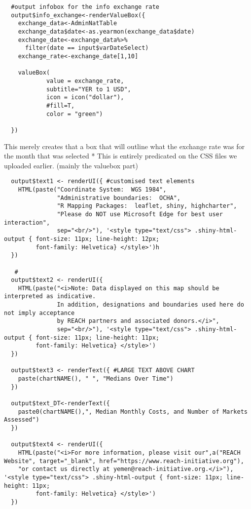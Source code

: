 \documentclass[
]{article}
\begin{document}
\begin{verbatim}
  #output infobox for the info exchange rate
  output$info_exchange<-renderValueBox({
    exchange_data<-AdminNatTable
    exchange_data$date<-as.yearmon(exchange_data$date)
    exchange_date<-exchange_data%>%
      filter(date == input$varDateSelect)
    exchange_rate<-exchange_date[1,10]
    
    valueBox(
            value = exchange_rate,
            subtitle="YER to 1 USD", 
            icon = icon("dollar"),
            #fill=T, 
            color = "green")
   
  })
\end{verbatim}

This merely creates that a box that will outline what the exchange rate
was for the month that was selected * This is entirely predicated on the
CSS files we uploaded earlier. (mainly the valuebox part)

\begin{verbatim}
  output$text1 <- renderUI({ #customised text elements
    HTML(paste("Coordinate System:  WGS 1984",
               "Administrative boundaries:  OCHA",
               "R Mapping Packages:  leaflet, shiny, highcharter",
               "Please do NOT use Microsoft Edge for best user interaction",
               sep="<br/>"), '<style type="text/css"> .shiny-html-output { font-size: 11px; line-height: 12px;
         font-family: Helvetica} </style>')h
  })
  
   #
  output$text2 <- renderUI({
    HTML(paste("<i>Note: Data displayed on this map should be interpreted as indicative. 
               In addition, designations and boundaries used here do not imply acceptance 
               by REACH partners and associated donors.</i>",
               sep="<br/>"), '<style type="text/css"> .shiny-html-output { font-size: 11px; line-height: 11px;
         font-family: Helvetica} </style>')
  })
  
  output$text3 <- renderText({ #LARGE TEXT ABOVE CHART
    paste(chartNAME(), " ", "Medians Over Time")
  })

  output$text_DT<-renderText({
    paste0(chartNAME(),", Median Monthly Costs, and Number of Markets Assessed")
  })
  
  output$text4 <- renderUI({
    HTML(paste("<i>For more information, please visit our",a("REACH Website", target="_blank", href="https://www.reach-initiative.org"), 
    "or contact us directly at yemen@reach-initiative.org.</i>"), '<style type="text/css"> .shiny-html-output { font-size: 11px; line-height: 11px;
         font-family: Helvetica} </style>')
  })
  
\end{verbatim}
\end{document}

